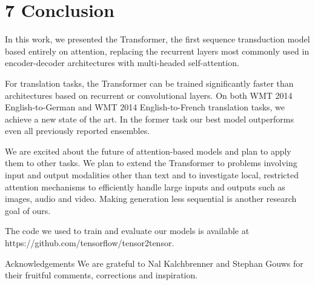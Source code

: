 \documentclass[12pt, a4paper]{article}
\begin{document}
\section{7 Conclusion}

In this work, we presented the Transformer, the first sequence transduction model based entirely on attention, replacing the recurrent layers most commonly used in encoder-decoder architectures with multi-headed self-attention.

For translation tasks, the Transformer can be trained significantly faster than architectures based on recurrent or convolutional layers. On both WMT 2014 English-to-German and WMT 2014 English-to-French translation tasks, we achieve a new state of the art. In the former task our best model outperforms even all previously reported ensembles.

We are excited about the future of attention-based models and plan to apply them to other tasks. We plan to extend the Transformer to problems involving input and output modalities other than text and to investigate local, restricted attention mechanisms to efficiently handle large inputs and outputs such as images, audio and video. Making generation less sequential is another research goal of ours.

The code we used to train and evaluate our models is available at https://github.com/tensorflow/tensor2tensor.

Acknowledgements We are grateful to Nal Kalchbrenner and Stephan Gouws for their fruitful comments, corrections and inspiration.
\end{document}

